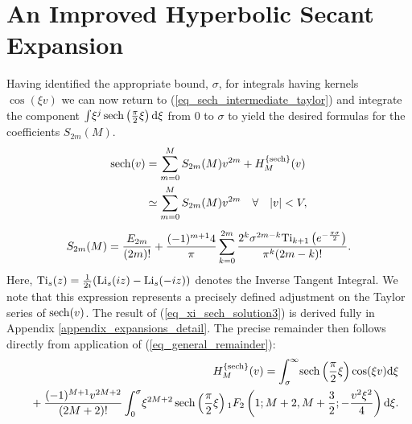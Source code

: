 \section{An Improved Hyperbolic Secant Expansion}
Having identified the appropriate bound, $\sigma$, for integrals having
kernels $\cos(\xi v)$ we can now return to
(\ref{eq_sech_intermediate_taylor}) and integrate the component
$
\int \!
\xi^j\operatorname{sech}\left(\frac{\pi}{2}\xi\right)
\mathrm{d}\xi
$
from $0$ to $\sigma$ to yield the desired formulas for the
coefficients $S_{2m}(M)$.
\begin{gather}
	\begin{split}
		\label{eq_sech_expansion_full}
		\operatorname{sech}(v) &= \sum_{m=0}^{M} S_{2m}(M) v^{2m} + H_M^{\{\operatorname{sech}\}}(v) \\
		&\simeq \sum_{m=0}^{M} S_{2m}(M) v^{2m} \quad \forall \quad |v| < V,
	\end{split}
	\\[1ex]
	\begin{split}
		S_{2m}(M) = \frac{E_{2m}}{(2m)!}
		+ \frac{(-1)^{m+1}4}{\pi} \sum_{k=0}^{2m}
		\frac{2^k \sigma^{2m-k}
			\mathrm{Ti}_{k+1}\left(e^{-\frac{\pi \sigma}{2}}\right)}
		{\pi^{k}(2m-k)!}.
		\label{eq_xi_sech_solution3}
	\end{split}
\end{gather}
Here, $\mathrm{Ti}_s(z) = \frac{1}{2i}(\operatorname{Li}_s(iz) - \operatorname{Li}_s(-iz))$ denotes the
Inverse Tangent Integral. We note that this expression represents a precisely defined adjustment on
the Taylor series of $\operatorname{sech}(v)$.  The result of (\ref{eq_xi_sech_solution3}) is
derived fully in Appendix \ref{appendix_expansions_detail}. The precise
remainder then follows directly from application of
(\ref{eq_general_remainder}):
\begin{align}
	\begin{split}
		&H_M^{\{\operatorname{sech}\}}(v) = \int_\sigma^{\infty} \!
		\operatorname{sech}\left(\frac{\pi}{2}\xi\right)
		\cos(\xi v) \mathrm{d}\xi
		\label{eq_sech_remainder2}
	\end{split}
	\\
	\begin{split}
		& \quad\quad + \frac{(-1)^{M+1}v^{2M+2}}{(2M+2)!} \int_0^{\sigma} \!
		\xi^{2M+2} \operatorname{sech}\left(\frac{\pi}{2}\xi\right)
		{}_{1}F_{2}\left(1; M+2, M+\frac{3}{2}; -\frac{v^2 \xi^2}{4}\right) \mathrm{d}\xi. \label{eq_sech_remainder1}
	\end{split}
\end{align}

